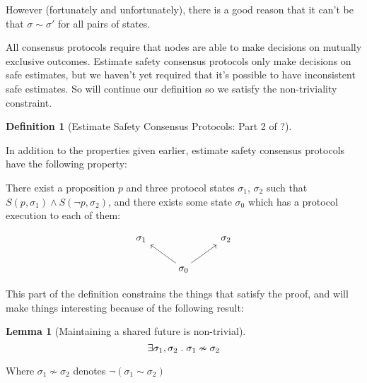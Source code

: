 \documentclass{article}
\theoremstyle{definition}
\newtheorem{lemma}{Lemma}
\newtheorem{defn}{Definition}[section]
\begin{document}
However (fortunately and unfortunately), there is a good reason that it can't be that $\sigma \sim \sigma'$ for all pairs of states. 

All consensus protocols require that nodes are able to make decisions on mutually exclusive outcomes. Estimate safety consensus protocols only make decisions on safe estimates, but we haven't yet required that it's possible to have inconsistent safe estimates. So will continue our definition so we satisfy the non-triviality constraint.

\begin{defn}[Estimate Safety Consensus Protocols: Part 2 of ?]
\begin{description}

In addition to the properties given earlier, estimate safety consensus protocols have the following property:

\item[(Non-triviality)]

There exist a proposition $p$ and three protocol states $\sigma_1$, $\sigma_2$ such that $S(p,\sigma_1) \land S(\neg{p},\sigma_2)$, and there exists some state $\sigma_0$ which has a protocol execution to each of them:

\begin{equation*}
\begin{tikzcd}
\sigma_1  
  &
{}
  &
\sigma_2
  \\ 
  &
\sigma_0
  \arrow[ur,""]
  \arrow[ul,""]
\end{tikzcd}
\end{equation*}


\end{description}
\end{defn}

This part of the definition constrains the things that satisfy the proof, and will make things interesting because of the following result:

\begin{lemma}[Maintaining a shared future is non-trivial]
$$
\exists \sigma_1, \sigma_2 \hspace{1mm}.\hspace{1mm} \sigma_1 \nsim \sigma_2
$$
\end{lemma}

Where $\sigma_1 \nsim \sigma_2$ denotes $\neg{(\sigma_1 \sim \sigma_2)}$
\end{document}
